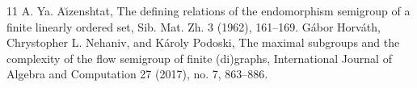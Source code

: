 \begin{thebibliography}{11}
 A. Ya. A\u{\i}zenshtat, The defining relations of the endomorphism semigroup of a finite linearly ordered set, Sib. Mat. Zh. 3 (1962), 161--169.
 Gábor Horváth, Chrystopher L. Nehaniv, and Károly Podoski, The maximal subgroups and the complexity of the flow semigroup of finite (di)graphs, International Journal of Algebra and Computation 27 (2017), no. 7, 863--886.
\end{thebibliography}

